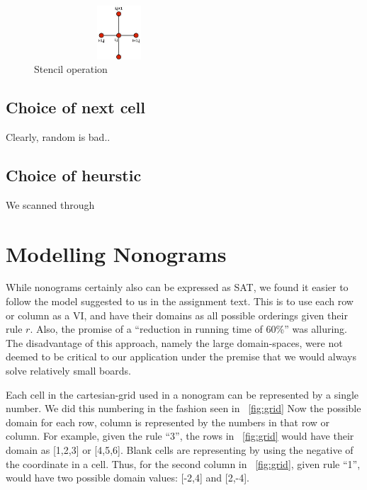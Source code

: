 \documentclass[journal]{IEEEtran}
\begin{document}
\begin{figure}[Hb]
\centering
    \includegraphics[height=2cm,keepaspectratio,width=2.5in]{stencil.jpg}
\caption{Stencil operation}
\label{fig:stencil}
\end{figure}

\subsection{Choice of next cell}
Clearly, random is bad..

\subsection{Choice of heurstic}
We scanned through 


\section*{Modelling Nonograms}
While nonograms certainly also can be expressed as SAT, we found it easier to
follow the model suggested to us in the assignment text. This is 
to use each row or column as a VI, and have their domains as all possible
orderings given their rule $r$. Also, the
promise of a ``reduction in running time of 60\%'' was alluring.
The disadvantage of this approach, namely the large domain-spaces, were not deemed
to be critical to our application under the premise that we would always solve
relatively small boards.

Each cell in the cartesian-grid used in a nonogram can be represented by a single number.
We did this numbering in the fashion seen in ~\autoref{fig:grid}
Now the possible domain for each row, column is represented by the numbers
in that row or column. For example, given the rule ``3'', the rows in  ~\autoref{fig:grid} would
have their domain as [1,2,3] or [4,5,6].
Blank cells are representing by using the negative of the coordinate in a cell.
Thus, for the second column in ~\autoref{fig:grid}, given rule ``1'', would have
two possible domain values: [-2,4] and [2,-4].
\end{document}
